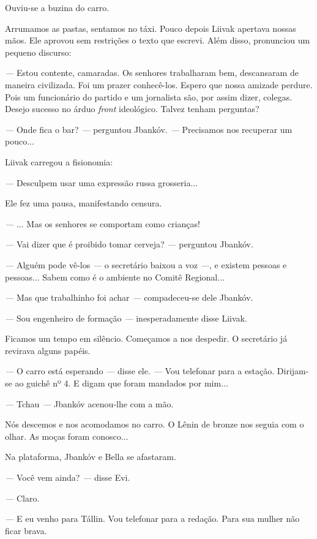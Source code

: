 Ouviu-se a buzina do carro.

Arrumamos as pastas, sentamos no táxi. Pouco depois Liivak apertava
nossas mãos. Ele aprovou sem restrições o texto que escrevi. Além disso,
pronunciou um pequeno discurso:

\emph{---} Estou contente, camaradas. Os senhores trabalharam bem,
descansaram de maneira civilizada. Foi um prazer conhecê-los. Espero que
nossa amizade perdure. Pois um funcionário do partido e um jornalista
são, por assim dizer, colegas. Desejo sucesso no árduo \emph{front}
ideológico. Talvez tenham perguntas?

\emph{---} Onde fica o bar? \emph{---} perguntou Jbankóv. \emph{---}
Precisamos nos recuperar um pouco...

Liivak carregou a fisionomia:

\emph{---} Desculpem usar uma expressão russa grosseria...

Ele fez uma pausa, manifestando censura.

\emph{---} ... Mas os senhores se comportam como crianças!

\emph{---} Vai dizer que é proibido tomar cerveja? \emph{---} perguntou
Jbankóv.

\emph{---} Alguém pode vê-los \emph{---} o secretário baixou a voz
\emph{---}, e existem pessoas e pessoas... Sabem como é o ambiente no
Comitê Regional...

\emph{---} Mas que trabalhinho foi achar \emph{---} compadeceu-se dele
Jbankóv.

\emph{---} Sou engenheiro de formação \emph{---} inesperadamente disse
Liivak.

Ficamos um tempo em silêncio. Começamos a nos despedir. O secretário já
revirava alguns papéis.

\emph{---} O carro está esperando \emph{---} disse ele. \emph{---} Vou
telefonar para a estação. Dirijam-se ao guichê nº 4. E digam que foram
mandados por mim...

\emph{---} Tchau \emph{---} Jbankóv acenou-lhe com a mão.

Nós descemos e nos acomodamos no carro. O Lênin de bronze nos seguia com
o olhar. As moças foram conosco...

Na plataforma, Jbankóv e Bella se afastaram.

\emph{---} Você vem ainda? \emph{---} disse Evi.

\emph{---} Claro.

\emph{---} E eu venho para Tállin. Vou telefonar para a redação. Para
sua mulher não ficar brava.

